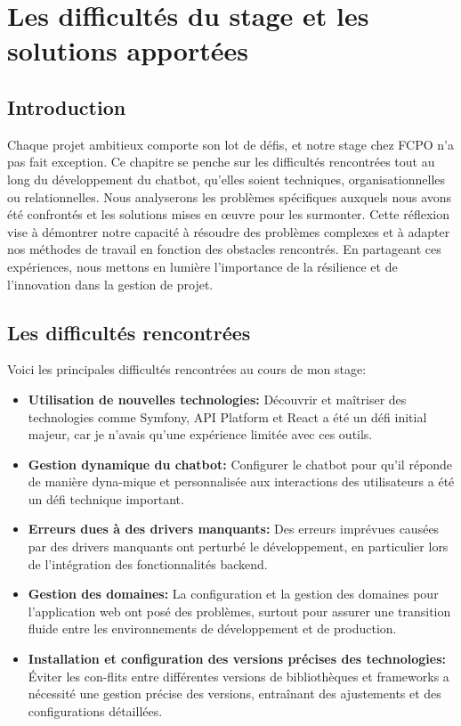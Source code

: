\chapter{Les difficultés du stage et les solutions apportées}
\label{chap:Chapter 6 title} 
\section*{Introduction}

\hspace{16pt}Chaque projet ambitieux comporte son lot de défis, et notre stage chez FCPO n'a pas fait exception. Ce chapitre se penche sur les difficultés rencontrées tout au long du développement du chatbot, qu'elles soient techniques, organisationnelles ou relationnelles. Nous analyserons les problèmes spécifiques auxquels nous avons été confrontés et les solutions mises en œuvre pour les surmonter. Cette réflexion vise à démontrer notre capacité à résoudre des problèmes complexes et à adapter nos méthodes de travail en fonction des obstacles rencontrés. En partageant ces expériences, nous mettons en lumière l'importance de la résilience et de l'innovation dans la gestion de projet.

\pagebreak

\section{Les difficultés rencontrées}

\hspace{16pt}Voici les principales difficultés rencontrées au cours de mon stage:

\begin{itemize}
  \item \textbf{Utilisation de nouvelles technologies: }Découvrir et maîtriser des technologies comme Symfony, API Platform et React a été un défi initial majeur, car je n'avais qu'une expérience limitée avec ces outils.
  \item \textbf{Gestion dynamique du chatbot: }Configurer le chatbot pour qu'il réponde de manière dyna-mique et personnalisée aux interactions des utilisateurs a été un défi technique important.
  \item \textbf{Erreurs dues à des drivers manquants: }Des erreurs imprévues causées par des drivers manquants ont perturbé le développement, en particulier lors de l'intégration des fonctionnalités backend.
  \item \textbf{Gestion des domaines: }La configuration et la gestion des domaines pour l'application web ont posé des problèmes, surtout pour assurer une transition fluide entre les environnements de développement et de production.
  \item \textbf{Installation et configuration des versions précises des technologies: }Éviter les con-flits entre différentes versions de bibliothèques et frameworks a nécessité une gestion précise des versions, entraînant des ajustements et des configurations détaillées.
\end{itemize}

